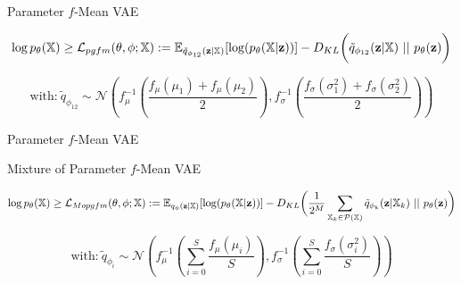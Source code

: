 \begin{frame}{Parameter $f$-Mean VAE}
    \begin{figure}
        \centering
    \end{figure}

    \begin{small}
        \begin{equation*}
            \log p_{\theta}(\mathbb{X}) \geq \mathcal{L}_{pgfm}(\theta, \phi; \mathbb{X}):= \mathbb{E}_{\tilde{q}_{\phi_{12}}(\textbf{z}|\mathbb{X})}[\log (p_{\theta}(\mathbb{X}|\textbf{z}))] - D_{KL}\biggl( \tilde{q}_{\phi_{12}}(\textbf{z}|\mathbb{X})\ ||\ p_{\theta}(\textbf{z})\biggr)
        \end{equation*}

        \begin{equation*}
            \text{with:}\ \tilde{q}_{\phi_{12}} \sim \mathcal{N}\left(  f_{\mu}^{-1}(\frac{f_{\mu}(\mu_1) + f_{\mu}(\mu_2)}{2}),f_{\sigma}^{-1}(\frac{f_{\sigma}(\sigma_1^2) + f_{\sigma}(\sigma_2^2)}{2})\right)
        \end{equation*}

    \end{small}

\end{frame}

\begin{frame}{Parameter $f$-Mean VAE}
    \begin{figure}
        \centering
    \end{figure}
\end{frame}

\begin{frame}{Mixture of Parameter $f$-Mean VAE}
    \begin{figure}
        \centering
    \end{figure}

    \begin{small}
        \begin{equation*}
            \log p_{\theta}(\mathbb{X}) \geq \mathcal{L}_{Mopgfm}(\theta, \phi; \mathbb{X}):= \mathbb{E}_{q_{\phi}(\textbf{z}|\mathbb{X})}[\log (p_{\theta}(\mathbb{X}|\textbf{z}))] - D_{KL}\biggl( \frac{1}{2^M} \sum _{\mathbb{X}_k \in \mathcal{P}(\mathbb{X})} \tilde{q}_{\phi_k}(\textbf{z}|\mathbb{X}_k)\ ||\ p_{\theta}(\textbf{z})\biggr)
        \end{equation*}

        \begin{equation*}
            \text{with:}\ \tilde{q}_{\phi_{i}} \sim \mathcal{N}\left(  f_{\mu}^{-1}(\sum ^S _{i = 0}\frac{f_{\mu}(\mu_i)}{S}),f_{\sigma}^{-1}(\sum ^S _{i = 0}\frac{f_{\sigma}(\sigma_i^2)}{S})\right)
        \end{equation*}
    \end{small}
\end{frame}

